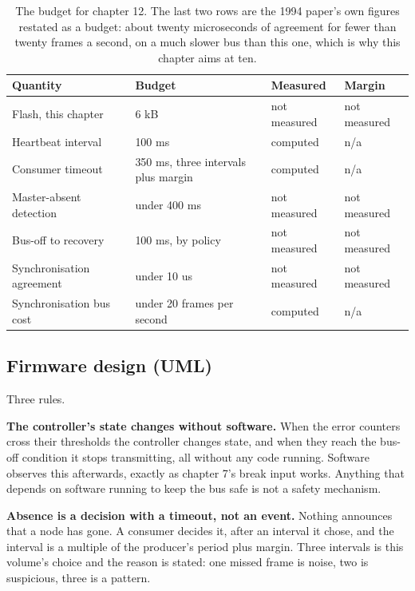 \begin{table}[H]\centering\small
\begin{tabular}{p{44mm}p{28mm}p{28mm}p{30mm}}
\toprule
Quantity & Budget & Measured & Margin \\
\midrule
Flash, this chapter & 6 kB & not measured & not measured \\
Heartbeat interval & 100 ms & computed & n/a \\
Consumer timeout & 350 ms, three intervals plus margin & computed & n/a \\
Master-absent detection & under 400 ms & not measured & not measured \\
Bus-off to recovery & 100 ms, by policy & not measured & not measured \\
Synchronisation agreement & under 10 us & not measured & not measured \\
Synchronisation bus cost & under 20 frames per second & computed & n/a \\
\bottomrule
\end{tabular}
\caption{The budget for chapter 12. The last two rows are the 1994 paper's own figures restated as a budget: about twenty microseconds of agreement for fewer than twenty frames a second, on a much slower bus than this one, which is why this chapter aims at ten.}
\end{table}

\subsection*{Firmware design (UML)}


Three rules.

\textbf{The controller's state changes without software.} When the error
counters cross their thresholds the controller changes state, and when they
reach the bus-off condition it stops transmitting, all without any code running.
Software observes this afterwards, exactly as chapter 7's break input works.
Anything that depends on software running to keep the bus safe is not a safety
mechanism.

\textbf{Absence is a decision with a timeout, not an event.} Nothing announces
that a node has gone. A consumer decides it, after an interval it chose, and the
interval is a multiple of the producer's period plus margin. Three intervals is
this volume's choice and the reason is stated: one missed frame is noise, two is
suspicious, three is a pattern.

